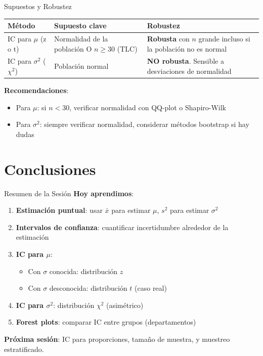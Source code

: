 \documentclass[aspectratio=169, 11pt]{beamer}
\begin{document}
\begin{frame}{Supuestos y Robustez}
\begin{table}
\centering
\small
\begin{tabular}{lp{5cm}p{5cm}}
\toprule
\textbf{Método} & \textbf{Supuesto clave} & \textbf{Robustez} \\
\midrule
IC para $\mu$ (z o t) & Normalidad de la población O $n \geq 30$ (TLC) & \textbf{Robusta} con $n$ grande incluso si la población no es normal \\[0.3cm]
IC para $\sigma^2$ ($\chi^2$) & Población \alert{normal} & \textbf{NO robusta}. Sensible a desviaciones de normalidad \\
\bottomrule
\end{tabular}
\end{table}

\vspace{0.3cm}
\textbf{Recomendaciones}:
\begin{itemize}
  \item Para $\mu$: si $n < 30$, verificar normalidad con QQ-plot o Shapiro-Wilk
  \item Para $\sigma^2$: siempre verificar normalidad, considerar métodos bootstrap si hay dudas
\end{itemize}
\end{frame}

\section{Conclusiones}

\begin{frame}{Resumen de la Sesión}
\textbf{Hoy aprendimos}:
\begin{enumerate}
  \item \textbf{Estimación puntual}: usar $\bar{x}$ para estimar $\mu$, $s^2$ para estimar $\sigma^2$
  \item \textbf{Intervalos de confianza}: cuantificar incertidumbre alrededor de la estimación
  \item \textbf{IC para $\mu$}:
  \begin{itemize}
    \item Con $\sigma$ conocida: distribución $z$
    \item Con $\sigma$ desconocida: distribución $t$ (caso real)
  \end{itemize}
  \item \textbf{IC para $\sigma^2$}: distribución $\chi^2$ (asimétrico)
  \item \textbf{Forest plots}: comparar IC entre grupos (departamentos)
\end{enumerate}

\vspace{0.3cm}
\textbf{Próxima sesión}: IC para proporciones, tamaño de muestra, y muestreo estratificado.
\end{frame}
\end{document}
